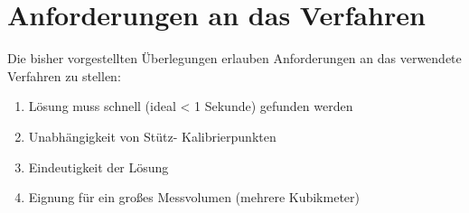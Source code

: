 \section{Anforderungen an das Verfahren}
Die bisher vorgestellten Überlegungen erlauben Anforderungen an das verwendete Verfahren zu stellen:
\begin{enumerate}
\item Lösung muss schnell (ideal < 1 Sekunde) gefunden werden
\item Unabhängigkeit von Stütz- Kalibrierpunkten
\item Eindeutigkeit der Lösung
\item Eignung für ein großes Messvolumen (mehrere Kubikmeter)
%
\end{enumerate}
%
